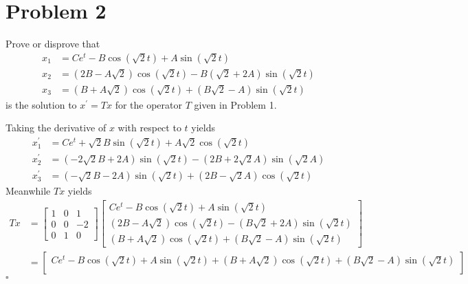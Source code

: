 \documentclass[11pt]{article}
\newenvironment{proof}{\noindent{\bf Proof.}}{\hfill $\square$\medskip}
\begin{document}
\section{Problem 2}
Prove or disprove that
\begin{equation}
    \begin{split}
        x_{1}&=Ce^{t}-B\cos(\sqrt{2}t)+A\sin(\sqrt{2}t)\\
        x_{2}&=(2B-A\sqrt{2})\cos(\sqrt{2}t)-B(\sqrt{2}+2A)\sin(\sqrt{2}t)\\
        x_{3}&=(B+A\sqrt{2})\cos(\sqrt{2}t)+(B\sqrt{2}-A)\sin(\sqrt{2}t)
    \end{split}
\end{equation}
is the solution to $x^{\prime}=Tx$ for the operator $T$ given in Problem 1.

\begin{proof}
    Taking the derivative of $x$ with respect to $t$ yields
    \begin{equation}
        \begin{split}
            x_{1}^{\prime}&=Ce^{t}+\sqrt{2}B\sin(\sqrt{2}t)+A\sqrt{2}\cos(\sqrt{2}t)\\
            x_{2}^{\prime}&=(-2\sqrt{2}B+2A)\sin(\sqrt{2}t)-(2B+2\sqrt{2}A)\sin(\sqrt{2}A)\\
            x_{3}^{\prime}&=(-\sqrt{2}B-2A)\sin(\sqrt{2}t)+(2B-\sqrt{2}A)\cos(\sqrt{2}t)
        \end{split}
    \end{equation}
    Meanwhile $Tx$ yields
    \begin{equation}
        \begin{split}
            Tx&=\begin{bmatrix}
                1 & 0 & 1  \\
                0 & 0 & -2 \\
                0 & 1 & 0
            \end{bmatrix}
            \begin{bmatrix}
                Ce^{t}-B\cos(\sqrt{2}t)+A\sin(\sqrt{2}t)\\
                (2B-A\sqrt{2})\cos(\sqrt{2}t)-(B\sqrt{2}+2A)\sin(\sqrt{2}t)\\
                (B+A\sqrt{2})\cos(\sqrt{2}t)+(B\sqrt{2}-A)\sin(\sqrt{2}t)
            \end{bmatrix}\\
            &=\begin{bmatrix}
                Ce^{t}-B\cos(\sqrt{2}t)+A\sin(\sqrt{2}t)+(B+A\sqrt{2})\cos(\sqrt{2}t)+(B\sqrt{2}-A)\sin(\sqrt{2}t)\\

\end{bmatrix}
\end{split}
\end{equation}
\end{proof}
\end{document}
